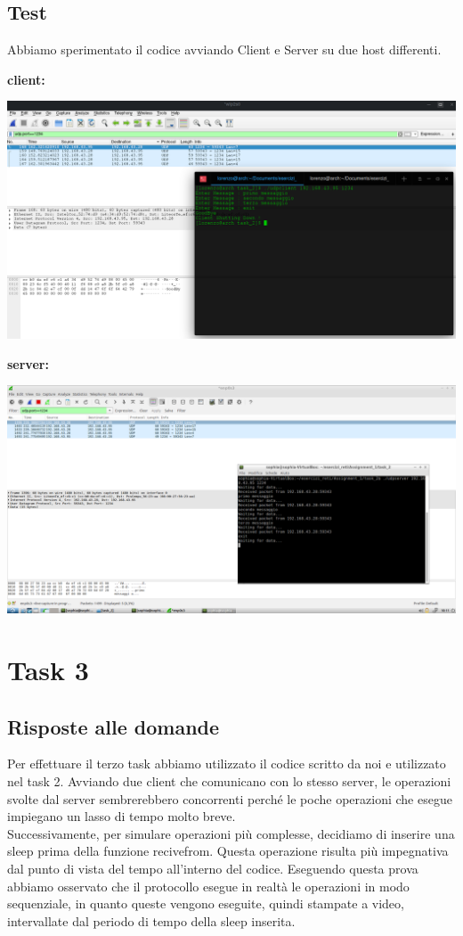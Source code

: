 \documentclass[a4paper]{article}
\begin{document}
\subsection{Test}
Abbiamo sperimentato il codice avviando Client e Server su due host differenti.\par
\begin{flushleft}
\textbf{client:}
\end{flushleft}
\includegraphics[width=\linewidth]{task_2/udp_client.png}
\begin{flushleft}
\textbf{server:}
\end{flushleft}
\includegraphics[width=\linewidth]{task_2/udp_server.png}

\newpage

\section{Task 3}
\subsection{Risposte alle domande}
Per effettuare il terzo task abbiamo utilizzato il codice scritto da noi e utilizzato nel task 2. Avviando due client che comunicano con lo stesso server, le operazioni svolte dal server sembrerebbero concorrenti perché le poche operazioni che esegue impiegano un lasso di tempo molto breve. \\ 
Successivamente, per simulare operazioni più complesse, decidiamo di inserire una sleep prima della funzione recivefrom. Questa operazione risulta più impegnativa dal punto di vista del tempo all’interno del codice. Eseguendo questa prova abbiamo osservato che il protocollo esegue in realtà le operazioni in modo sequenziale, in quanto queste vengono eseguite, quindi stampate a video, intervallate dal periodo di tempo della sleep inserita.
\end{document}
